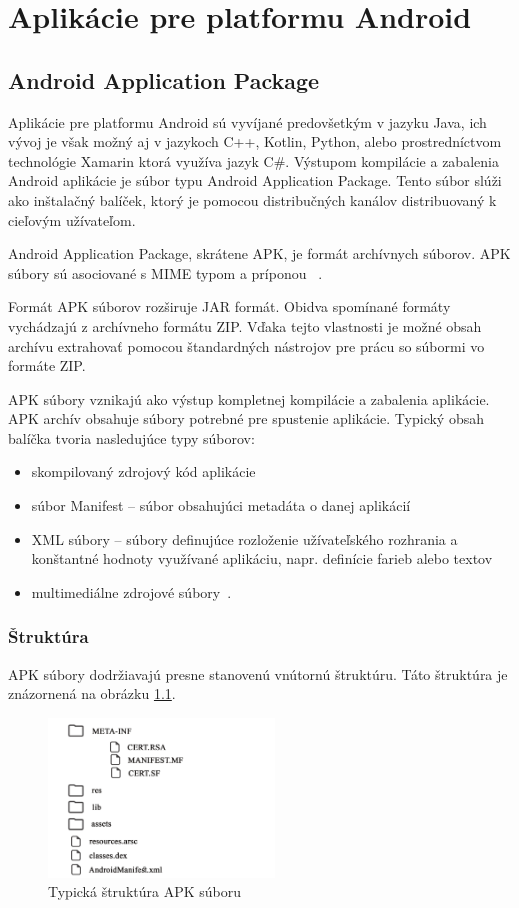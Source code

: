 \chapter{Aplikácie pre platformu Android}
\section{Android Application Package}
Aplikácie pre platformu Android sú vyvíjané predovšetkým v jazyku Java, ich vývoj je však možný aj v jazykoch C++, Kotlin, Python, alebo prostredníctvom technológie Xamarin ktorá využíva jazyk C\#. Výstupom kompilácie a zabalenia Android aplikácie je súbor typu Android Application Package. Tento súbor slúži ako inštalačný balíček, ktorý je pomocou distribučných kanálov distribuovaný k cieľovým užívateľom.

Android Application Package, skrátene APK, je formát archívnych súborov. APK súbory sú asociované s MIME typom  a príponou ~\cite{IANA}. 

Formát APK súborov rozširuje JAR formát. Obidva spomínané formáty vychádzajú z archívneho formátu ZIP. Vďaka tejto vlastnosti je možné obsah archívu extrahovať pomocou štandardných nástrojov pre prácu so súbormi vo formáte ZIP.

APK súbory vznikajú ako výstup kompletnej kompilácie a zabalenia aplikácie. APK archív obsahuje súbory potrebné pre spustenie aplikácie. Typický obsah balíčka tvoria nasledujúce typy súborov:
\begin{itemize}
	\item skompilovaný zdrojový kód aplikácie
	\item súbor Manifest – súbor obsahujúci metadáta o danej aplikácií
	\item XML súbory – súbory definujúce rozloženie užívateľského rozhrania a konštantné hodnoty využívané aplikáciu, napr. definície farieb alebo textov
	\item multimediálne zdrojové súbory~\cite{Allen2015}.
\end{itemize}

\subsection{Štruktúra}
APK súbory dodržiavajú presne stanovenú vnútornú štruktúru. Táto štruktúra je znázornená na obrázku \ref{fig:strukturaApk}.

\begin{figure}[htb]
  \begin{center}
    \includegraphics[width=60mm]{images/apkStructure.pdf}
  \end{center}
  \caption{Typická štruktúra APK súboru}
  \label{fig:strukturaApk}
\end{figure}


